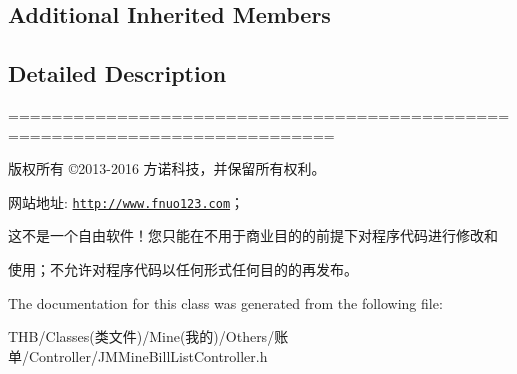 \subsection*{Additional Inherited Members}


\subsection{Detailed Description}
============================================================================

版权所有 ©2013-\/2016 方诺科技，并保留所有权利。

网站地址\+: \href{http://www.fnuo123.com}{\tt http\+://www.\+fnuo123.\+com}； 



这不是一个自由软件！您只能在不用于商业目的的前提下对程序代码进行修改和

使用；不允许对程序代码以任何形式任何目的的再发布。 

 

The documentation for this class was generated from the following file\+:\begin{DoxyCompactItemize}
\item 
T\+H\+B/\+Classes(类文件)/\+Mine(我的)/\+Others/账单/\+Controller/J\+M\+Mine\+Bill\+List\+Controller.\+h\end{DoxyCompactItemize}
